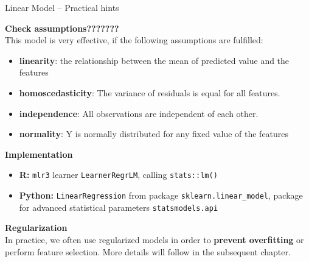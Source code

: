 \documentclass[11pt,compress,t,notes=noshow, xcolor=table]{beamer}
\newcommand{\highlight}[1]{\textcolor{highlightcol}{\textbf{#1}}}
\let\code=\texttt
\begin{document}
\begin{frame}{Linear Model -- Practical hints}

\footnotesize

 \highlight{Check assumptions???????} \\
 This model is very effective, if the following assumptions are fulfilled:
 \begin{itemize}\footnotesize
  \item \textbf{linearity}: the relationship between the mean of predicted value and the features
  \item \textbf{homoscedasticity}: The variance of residuals is equal for all features.
  \item \textbf{independence}: All observations are independent of each other.
  \item \textbf{normality}: Y is normally distributed for any fixed value of the features
\end{itemize}

\medskip

  \highlight{Implementation}
  
  \begin{itemize}
    \item \textbf{R:} \code{mlr3} learner \code{LearnerRegrLM}, calling \code{stats::lm()}
    \item \textbf{Python:} \code{LinearRegression} from package 
    \code{sklearn.linear\_model}, package for advanced statistical parameters 
    \code{statsmodels.api} 
  \end{itemize}

\medskip

 \highlight{Regularization} \\

 In practice, we often use regularized models in order to \textbf{prevent overfitting} or perform feature selection. More details will follow in the subsequent chapter. 


\end{frame}

\end{document}
